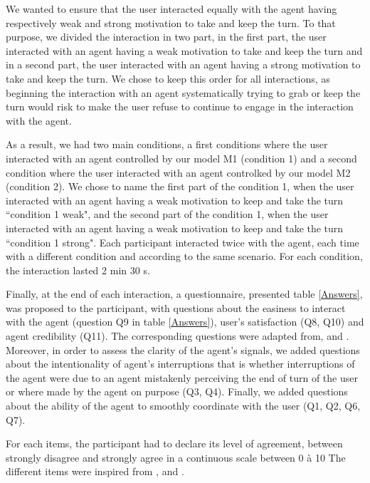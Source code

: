 We wanted to ensure that the user interacted equally with the agent having respectively weak and strong motivation to take and keep the turn. To that purpose, we divided the interaction in two part, in the first part, the user interacted with an agent having a weak motivation to take and keep the turn and in a second part, the user interacted with an agent having a strong motivation to take and keep the turn. We chose to keep this order for all interactions, as beginning the interaction with an agent systematically trying to grab or keep the turn would risk to make the user refuse to continue to engage in the interaction with the agent. 

As a result, we had two main conditions, a first conditions where the user interacted with an agent controlled by our model M1 (condition 1) and a second condition where the user interacted with an agent controlked by our model M2 (condition 2). We chose to name the first part of the condition 1, when the user interacted with an agent having a weak motivation to keep and take the turn ``condition 1 weak", and the second part of the condition 1, when the user interacted with an agent having a weak motivation to keep and take the turn ``condition 1 strong". 
Each participant interacted twice with the agent, each time with a different condition and according to the same scenario. For each condition, the interaction lasted 2 min 30 s. 

Finally, at the end of each interaction, a questionnaire, presented table \ref{Answers}, was proposed to the participant, with questions about the easiness to interact with the agent (question Q9 in table \ref{Answers}), user's satisfaction (Q8, Q10) and agent credibility (Q11). The corresponding questions were adapted from\cite{skantze_towards_2010}, \cite{bevacqua_effects_2014} and \cite{de_vault_toward_2015}. Moreover, in order to assess the clarity of the agent's signals, we added questions about the intentionality of agent's interruptions that is whether interruptions of the agent were due to an agent mistakenly perceiving the end of turn of the user or where made by the agent on purpose (Q3, Q4). Finally, we added questions about the ability of the agent to smoothly coordinate with the user (Q1, Q2, Q6, Q7).

For each items, the participant had to declare its level of agreement, between strongly disagree and strongly agree in a continuous scale between 0 à 10 The different items were inspired from \cite{skantze_towards_2010}, \cite{bevacqua_effects_2014} and \cite{de_vault_toward_2015}.


